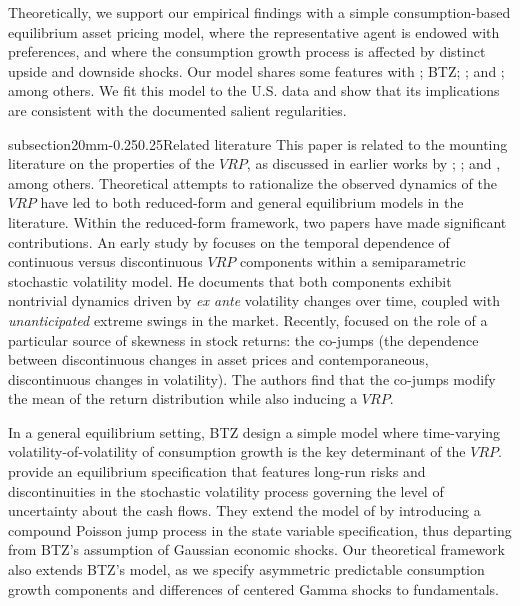 \documentclass[11pt]{article}
\makeatletter
\renewcommand\subsection{\@startsection%
    {subsection}{2}{0mm}{-0.25\baselineskip}{0.25\baselineskip}{\bfseries\large}}
\makeatother
\begin{document}
Theoretically, we support our empirical findings with a simple consumption-based equilibrium asset pricing model, where the representative agent is endowed with \cite{EZ89Econometrica} preferences, and where the consumption growth process is affected by distinct upside and downside shocks. Our model shares some features with \cite{BansalYaron04JF}; BTZ; \cite{ShaliastovichYaronSegal14}; and \cite{BekaertEngstrom14}; among others. We fit this model to the U.S. data and show that its implications are consistent with the documented salient regularities.


\subsection{Related literature} \label{SubsecLitRev}
This paper is related to the mounting literature on the properties of the $VRP$, as discussed in earlier works by \cite{Bakshi01042003}; \cite{Vilkov08WP}; and \cite{Carr01032009}, among others. Theoretical attempts to rationalize the observed dynamics of the $VRP$ have led to both reduced-form and general equilibrium models in the literature. Within the reduced-form framework, two papers have made significant contributions. An early study by \cite{Todorov10RFS} focuses on the temporal dependence of continuous versus discontinuous $VRP$ components within a semiparametric stochastic volatility model. He documents that both components exhibit nontrivial dynamics driven by \emph{ex ante} volatility changes over time, coupled with \emph{unanticipated} extreme swings in the market. Recently, \cite{BandiReno} focused on the role of a particular source of skewness in stock returns: the co-jumps (the dependence between discontinuous changes in asset prices and contemporaneous, discontinuous changes in volatility). The authors find that the co-jumps modify the mean of the return distribution while also inducing a $VRP$.

In a general equilibrium setting, BTZ design a simple model where time-varying volatility-of-volatility of consumption growth is the key determinant of the $VRP$. \cite{DrechslerYaron11RFS} provide an equilibrium specification that features long-run risks and discontinuities in the stochastic volatility process governing the level of uncertainty about the cash flows. They extend the model of \cite{BansalYaron04JF} by introducing a compound Poisson jump process in the state variable specification, thus departing from BTZ's assumption of Gaussian economic shocks. Our theoretical framework also extends BTZ's model, as we specify asymmetric predictable consumption growth components and differences of centered Gamma shocks to fundamentals.
\end{document}
